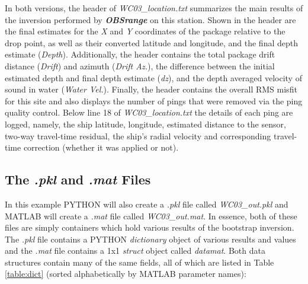 \documentclass[titlepage, 12pt]{article}
\begin{document}
  In both versions, the header of \textit{WC03\_location.txt} summarizes the main results of the inversion performed by \textbf{\textit{OBSrange}} on this station. Shown in the header are the final estimates for the \textit{X} and \textit{Y} coordinates of the package relative to the drop point, as well as their converted latitude and longitude, and the final depth estimate (\textit{Depth}). Additionally, the header contains the total package drift distance (\textit{Drift}) and azimuth (\textit{Drift Az.}), the difference between the initial estimated depth and final depth estimate (\textit{dz}), and the depth averaged velocity of sound in water (\textit{Water Vel.}). Finally, the header contains the overall RMS misfit for this site and also displays the number of pings that were removed via the ping quality control. Below line 18 of \textit{WC03\_location.txt} the details of each ping are logged, namely, the ship latitude, longitude, estimated distance to the sensor, two-way travel-time residual, the ship's radial velocity and corresponding travel-time correction (whether it was applied or not).
 
  \subsection{The \textit{.pkl} and \textit{.mat} Files}
  In this example PYTHON will also create a \textit{.pkl} file called \textit{WC03\_out.pkl} and MATLAB will create a \textit{.mat} file called \textit{WC03\_out.mat}. In essence, both of these files are simply containers which hold various results of the bootstrap inversion. The \textit{.pkl} file contains a PYTHON \textit{dictionary} object of various results and values and the \textit{.mat} file contains a 1x1 \textit{struct} object called \textit{datamat}. Both data structures contain many of the same fields, all of which are listed in Table \ref{table:dict} (sorted alphabetically by MATLAB parameter names):
\end{document}
